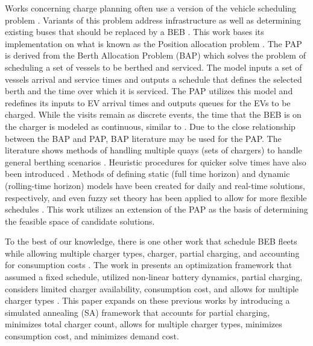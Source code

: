 \documentclass[energies,article,submit,moreauthors]{Definitions/mdpi}
\begin{document}
Works concerning charge planning often use a version of the vehicle scheduling problem \cite{tang-2019-robus-sched,li-2014-trans-bus,he-2020-optim-charg}. Variants of this problem address infrastructure as well as determining
existing buses that should be replaced by a BEB \cite{zhou-2020-bi-objec,duan-2021-refor-mixed,rinaldi-2020-mixed-fleet,zhou-2020-collab-optim}. This work bases its implementation on what is known as the Position
allocation problem \cite{qarebagh-2019-optim-sched}. The PAP is derived from the Berth Allocation Problem (BAP) which
solves the problem of scheduling a set of vessels to be berthed and serviced. The model inputs a set of vessels arrival
and service times and outputs a schedule that defines the selected berth and the time over which it is serviced. The PAP
utilizes this model and redefines its inputs to EV arrival times and outputs queues for the EVs to be charged. While the
visits remain as discrete events, the time that the BEB is on the charger is modeled as continuous, similar to
\cite{frojan-2015-contin-berth,qarebagh-2019-optim-sched,zhou-2020-collab-optim}. Due to the close relationship
between the BAP and PAP, BAP literature may be used for the PAP. The literature shows methods of handling multiple quays
(sets of chargers) to handle general berthing scenarios \cite{frojan-2015-contin-berth,dai-2008-suppl-chain-analy}.
Heuristic procedures for quicker solve times have also been introduced \cite{imai-2001-dynam-berth}. Methods of
defining static (full time horizon) and dynamic (rolling-time horizon) models have been created for daily and real-time
solutions, respectively, and even fuzzy set theory has been applied to allow for more flexible schedules
\cite{bello-2019-fuzzy-activ,dai-2008-suppl-chain-analy,buhrkal-2011-model-discr,frojan-2015-contin-berth}. This
work utilizes an extension of the PAP as the basis of determining the feasible space of candidate solutions.

To the best of our knowledge, there is one other work that schedule BEB fleets while allowing multiple charger types,
charger, partial charging, and accounting for consumption costs \cite{whitaker-2023-a-network}. The work in
\cite{whitaker-2023-a-network} presents an optimization framework that assumed a fixed schedule, utilized non-linear
battery dynamics, partial charging, considers limited charger availability, consumption cost, and allows for multiple
charger types \cite{whitaker-2023-a-network}. This paper expands on these previous works by introducing a simulated
annealing (SA) framework that accounts for partial charging, minimizes total charger count, allows for multiple charger
types, minimizes consumption cost, and minimizes demand cost.
\end{document}
